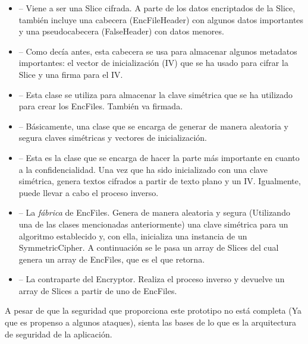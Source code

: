 \begin{itemize}
  \item {} -- Viene a ser una Slice cifrada. A parte de los datos
  encriptados de la Slice, también incluye una cabecera (EncFileHeader) con
  algunos datos importantes y una pseudocabecera (FalseHeader) con datos menores.

  \item {} -- Como decía antes, esta cabecera se usa para
  almacenar algunos metadatos importantes: el vector de inicialización (IV) que
  se ha usado para cifrar la Slice y una firma para el IV.

  \item {} -- Esta clase se utiliza para almacenar la clave
  simétrica que se ha utilizado para crear los EncFiles. También va firmada.

  \item {} -- Básicamente, una clase que se encarga de
  generar de manera aleatoria y segura claves simétricas y vectores de
  inicialización.

  \item {} -- Esta es la clase que se encarga de hacer
  la parte más importante en cuanto a la confidencialidad. Una vez que ha sido
  inicializado con una clave simétrica, genera textos cifrados a partir de
  texto plano y un IV. Igualmente, puede llevar a cabo el proceso inverso.

  \item {} -- La \emph{fábrica} de EncFiles. Genera de manera
  aleatoria y segura (Utilizando una de las clases mencionadas anteriormente)
  una clave simétrica para un algoritmo establecido y, con ella, inicializa una
  instancia de un SymmetricCipher. A continuación se le pasa un array de Slices
  del cual genera un array de EncFiles, que es el que retorna.

  \item {} -- La contraparte del Encryptor. Realiza el proceso
  inverso y devuelve un array de Slices a partir de uno de EncFiles.
\end{itemize}

A pesar de que la seguridad que proporciona este prototipo no está completa (Ya
que es propenso a algunos ataques), sienta las bases de lo que es la arquitectura
de seguridad de la aplicación.
